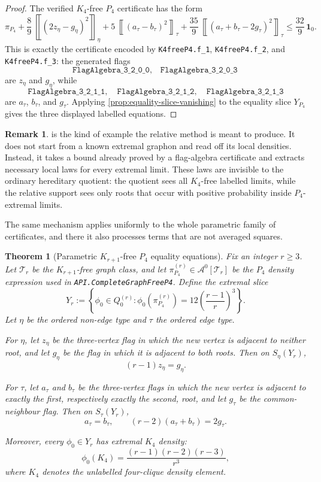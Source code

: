 \documentclass[11pt]{article}
\newtheorem{theorem}{Theorem}
\theoremstyle{definition}
\newtheorem{remark}[remark]{Remark}
\newcommand{\A}{\mathcal{A}}
\newcommand{\T}{\mathcal{T}}
\newcommand{\avg}[2]{\left\llbracket #1 \right\rrbracket_{#2}}
\newcommand{\one}{\mathbf 1}
\begin{document}
\begin{proof}
The verified $K_4$-free $P_4$ certificate has the form
\[
  \pi_{P_4}
  +\frac89\,\avg{(2z_\eta-g_\eta)^2}{\eta}
  +5\,\avg{(a_\tau-b_\tau)^2}{\tau}
  +\frac{35}{9}\,\avg{(a_\tau+b_\tau-2g_\tau)^2}{\tau}
  \le \frac{32}{9}\,\one_0 .
\]
This is exactly the certificate encoded by
\texttt{K4freeP4.f\_1}, \texttt{K4freeP4.f\_2}, and \texttt{K4freeP4.f\_3}:
the generated flags
\[
  \texttt{FlagAlgebra\_3\_2\_0\_0},\quad
  \texttt{FlagAlgebra\_3\_2\_0\_3}
\]
are $z_\eta$ and $g_\eta$, while
\[
  \texttt{FlagAlgebra\_3\_2\_1\_1},\quad
  \texttt{FlagAlgebra\_3\_2\_1\_2},\quad
  \texttt{FlagAlgebra\_3\_2\_1\_3}
\]
are $a_\tau$, $b_\tau$, and $g_\tau$.  Applying
\cref{prop:equality-slice-vanishing} to the equality slice $Y_{P_4}$ gives the three
displayed labelled equations.
\end{proof}

\begin{remark}
 is the kind of example the relative method is meant
to produce.  It does not start from a known extremal graphon and read off its local
densities.  Instead, it takes a bound already proved by a flag-algebra certificate and
extracts necessary local laws for every extremal limit.  These laws are invisible to the
ordinary hereditary quotient: the quotient sees all $K_4$-free labelled limits, while the
relative support sees only roots that occur with positive probability inside
$P_4$-extremal limits.
\end{remark}

The same mechanism applies uniformly to the whole parametric family of certificates, and
there it also processes terms that are not averaged squares.

\begin{theorem}[Parametric $K_{r+1}$-free $P_4$ equality equations]
\label{thm:parametric-p4-equality-slice}
Fix an integer $r\ge3$.  Let $\T_r$ be the $K_{r+1}$-free graph class, and let
$\pi_{P_4}^{(r)}\in\A^0[\T_r]$ be the $P_4$ density expression used in
\texttt{API.CompleteGraphFreeP4}.  Define the extremal slice
\[
  Y_r:=\left\{\phi_0\in Q_0^{(r)}:
    \phi_0(\pi_{P_4}^{(r)})=12\left(\frac{r-1}{r}\right)^3\right\}.
\]
Let $\eta$ be the ordered non-edge type and $\tau$ the ordered edge type.

For $\eta$, let $z_\eta$ be the three-vertex flag in which the new vertex is adjacent
to neither root, and let $g_\eta$ be the flag in which it is adjacent to both roots.
Then on $S_\eta(Y_r)$,
\[
  (r-1)z_\eta=g_\eta .
\]

For $\tau$, let $a_\tau$ and $b_\tau$ be the three-vertex flags in which the new
vertex is adjacent to exactly the first, respectively exactly the second, root, and let
$g_\tau$ be the common-neighbour flag.  Then on $S_\tau(Y_r)$,
\[
  a_\tau=b_\tau,
  \qquad
  (r-2)(a_\tau+b_\tau)=2g_\tau .
\]

Moreover, every $\phi_0\in Y_r$ has extremal $K_4$ density:
\[
  \phi_0(K_4)=\frac{(r-1)(r-2)(r-3)}{r^3},
\]
where $K_4$ denotes the unlabelled four-clique density element.
\end{theorem}
\end{document}
